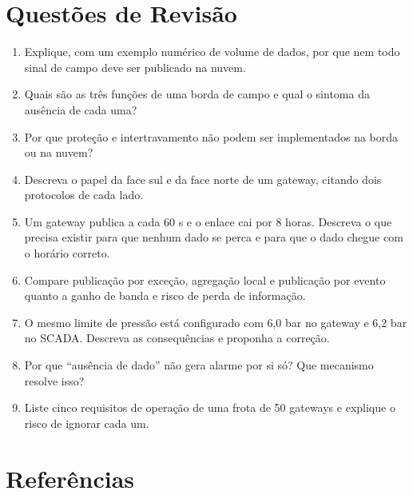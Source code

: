\section{Questões de Revisão}\label{questuxf5es-de-revisuxe3o}

\begin{enumerate}
\def\labelenumi{\arabic{enumi}.}
\tightlist
\item
  Explique, com um exemplo numérico de volume de dados, por que nem todo sinal de campo deve ser publicado na nuvem.
\item
  Quais são as três funções de uma borda de campo e qual o sintoma da ausência de cada uma?
\item
  Por que proteção e intertravamento não podem ser implementados na borda ou na nuvem?
\item
  Descreva o papel da face sul e da face norte de um gateway, citando dois protocolos de cada lado.
\item
  Um gateway publica a cada 60 s e o enlace cai por 8 horas. Descreva o que precisa existir para que nenhum dado se perca e para que o dado chegue com o horário correto.
\item
  Compare publicação por exceção, agregação local e publicação por evento quanto a ganho de banda e risco de perda de informação.
\item
  O mesmo limite de pressão está configurado com 6,0 bar no gateway e 6,2 bar no SCADA. Descreva as consequências e proponha a correção.
\item
  Por que ``ausência de dado'' não gera alarme por si só? Que mecanismo resolve isso?
\item
  Liste cinco requisitos de operação de uma frota de 50 gateways e explique o risco de ignorar cada um.
\end{enumerate}

\section{Referências}\label{referuxeancias}

